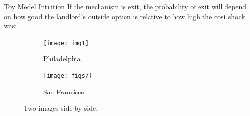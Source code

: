 \documentclass[10pt, xcolor=dvipsnames]{beamer}
\begin{document}
\begin{frame}{Toy Model Intuition}
    If the mechanism is exit, the probability of exit will depend on how good the landlord's outside option is relative to how high the cost shock was:

    \begin{figure}[t]
          \centering
          \begin{subfigure}{0.48\textwidth}
            \texttt{[image: img1]}
            \caption{Philadelphia}\label{fig:left}
          \end{subfigure}\hfill
          \begin{subfigure}{0.48\textwidth}
            \texttt{[image: figs/]}
            \caption{San Francisco}\label{fig:right}
          \end{subfigure}
          \caption{Two images side by side.}\label{fig:pair}
\end{figure}
    
\end{frame}






\end{document}
